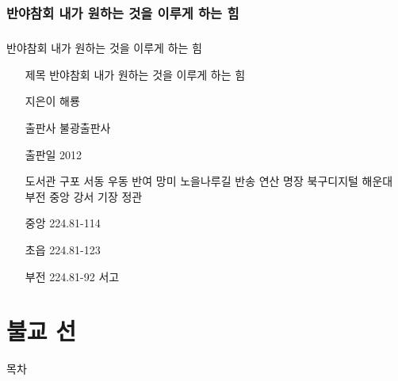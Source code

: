 \documentclass[aspectratio=1610,17pt,xcolor=pdftex,dvipsnames,table,handout]{beamer}
\begin{document}
		\section{ 반야참회 내가 원하는 것을 이루게 하는 힘 }
		\begin{frame} [t,plain]
		\frametitle{}
			\begin{block} { 반야참회 내가 원하는 것을 이루게 하는 힘 }
			\setlength{\leftmargini}{4em}			
			\begin{itemize}
				\item [제목]  	반야참회 내가 원하는 것을 이루게 하는 힘 
				\item [지은이]	해룡
				\item [출판사]	불광출판사
				\item [출판일]	2012
				\item [도서관]	구포 서동 우동 반여 망미 노을나루길 반송 연산 명장 북구디지털 해운대 부전 중앙 강서 기장 정관
				\item [중앙]		224.81-114
				\item [초읍]		224.81-123
				\item [부전]		224.81-92 서고
			\end{itemize}
			\end{block}						
		\end{frame}						




		\begin{frame} [t,plain]
		\end{frame}			
		\begin{frame} [t,plain]
		\end{frame}			





		\part{ 불교 선 }
		\frame{\partpage}

		\begin{frame} [plain]{목차}
		\tableofcontents%
		\end{frame}
\end{document}
